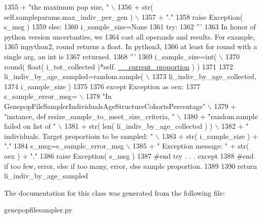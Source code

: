 \begin{DoxyCode}
1355                     + \textcolor{stringliteral}{"the maximum pop size, "} \(\backslash\)
1356                     + str( self.sampleparams.max\_indiv\_per\_gen ) \(\backslash\)
1357                     + \textcolor{stringliteral}{"."}
1358             \textcolor{keywordflow}{raise} Exception( s\_msg )
1359         \textcolor{keywordflow}{else}:
1360             i\_sample\_size=\textcolor{keywordtype}{None}
1361             \textcolor{keywordflow}{try}:
1362                 \textcolor{stringliteral}{'''}
1363 \textcolor{stringliteral}{                In honor of python version uncertanties, we}
1364 \textcolor{stringliteral}{                cast all operands and results.  For example, }
1365 \textcolor{stringliteral}{                inpython2, round returns a float.  In python3,}
1366 \textcolor{stringliteral}{                at least for round with a single arg, an int is }
1367 \textcolor{stringliteral}{                returned.}
1368 \textcolor{stringliteral}{                '''}
1369                 i\_sample\_size=int( \(\backslash\)
1370                         round( float( i\_tot\_collected )*self.
      \hyperlink{classnegui_1_1genepopfilesampler_1_1GenepopFileSamplerIndividualsAgeStructureCohortsPercentage_a20c7fca4ce503d025b2728ee416b1d6a}{\_\_current\_proportion} ) )
1371 
1372                 li\_indiv\_by\_age\_sampled=random.sample( \(\backslash\)
1373                                     li\_indiv\_by\_age\_collected,
1374                                                 i\_sample\_size )
1375                                         
1376             \textcolor{keywordflow}{except} Exception \textcolor{keyword}{as} oex:
1377                 s\_sample\_error\_msg= \(\backslash\)
1378                     \textcolor{stringliteral}{"In GenepopFileSamplerIndividualsAgeStructureCohortsPercentage"} \(\backslash\)
1379                         + \textcolor{stringliteral}{"instance, def resize\_sample\_to\_meet\_size\_criteria, "}  \(\backslash\)
1380                         + \textcolor{stringliteral}{"random.sample failed on list of "} \(\backslash\)
1381                         + str( len( li\_indiv\_by\_age\_collected ) ) \(\backslash\)
1382                         + \textcolor{stringliteral}{" individuals.  Target proportioin to be sampled: "} \(\backslash\)
1383                         + str( i\_sample\_size  ) + \textcolor{stringliteral}{"."}
1384                 s\_msg=s\_sample\_error\_msg \(\backslash\)
1385                         + \textcolor{stringliteral}{"  Exception message: "} + str( oex ) + \textcolor{stringliteral}{"."}
1386                 \textcolor{keywordflow}{raise} Exception( s\_msg )
1387             \textcolor{comment}{#end try . . . except}
1388         \textcolor{comment}{#end if too few, error, else if too many, error, else sample proportion.}
1389 
1390         \textcolor{keywordflow}{return} li\_indiv\_by\_age\_sampled
\end{DoxyCode}


The documentation for this class was generated from the following file\+:\begin{DoxyCompactItemize}
\item 
genepopfilesampler.\+py\end{DoxyCompactItemize}
